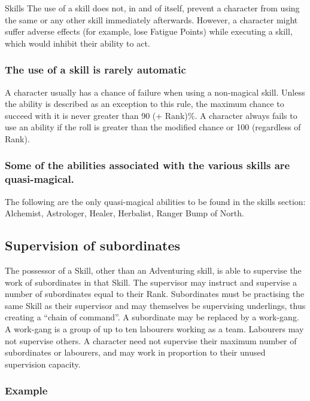 \begin{Chapter}{Skills}
The use of a skill does not, in and of itself, prevent a character
from using the same or any other skill immediately afterwards.
However, a character might suffer adverse effects (for example, lose
Fatigue Points) while executing a skill, which would inhibit their
ability to act.

\subsubsection{The use of a skill is rarely automatic}

A character usually has a chance of failure when using a non-magical
skill.  Unless the ability is described as an exception to this rule,
the maximum chance to succeed with it is never greater than 90 (+
Rank)\%.  A character always fails to use an ability if the roll is
greater than the modified chance or 100 (regardless of Rank).

\subsubsection{Some of the abilities associated with the various skills are
quasi-magical.}

The following are the only quasi-magical abilities to be found in the
skills section: Alchemist, Astrologer, Healer, Herbalist, Ranger Bump
of North.

\subsection{Supervision of subordinates}

The possessor of a Skill, other than an Adventuring skill, is able to
supervise the work of subordinates in that Skill.  The supervisor may
instruct and supervise a number of subordinates equal to their Rank.
Subordinates must be practising the same Skill as their supervisor and
may themselves be supervising underlings, thus creating a “chain of
command”.  A subordinate may be replaced by a work-gang.  A work-gang
is a group of up to ten labourers working as a team.  Labourers may
not supervise others.  A character need not supervise their maximum
number of subordinates or labourers, and may work in proportion to
their unused supervision capacity.

\subsubsection{Example}


\end{Chapter}
